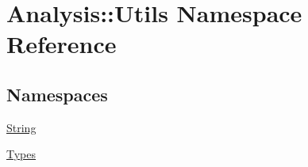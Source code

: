 \hypertarget{namespaceAnalysis_1_1Utils}{}\section{Analysis\+:\+:Utils Namespace Reference}
\label{namespaceAnalysis_1_1Utils}
\subsection*{Namespaces}
\begin{DoxyCompactItemize}
\item 
 \hyperlink{namespaceAnalysis_1_1Utils_1_1String}{String}
\item 
 \hyperlink{namespaceAnalysis_1_1Utils_1_1Types}{Types}
\end{DoxyCompactItemize}
